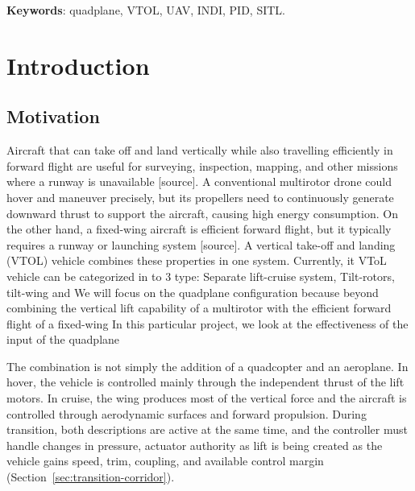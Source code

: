 \documentclass{article}
\begin{document}
\noindent\textbf{Keywords}: quadplane, VTOL, UAV, INDI, PID, SITL.



\clearpage

\section{Introduction}
\label{sec:introduction}

\subsection{Motivation}
Aircraft that can take off and land vertically while also travelling efficiently in forward flight are useful for surveying, inspection, mapping, and other missions where a runway is unavailable [source].
A conventional multirotor drone could hover and maneuver precisely, but its propellers need to continuously generate downward thrust to support the aircraft, causing high energy consumption. On the other hand, a fixed-wing aircraft is efficient forward flight, but it typically requires a runway or launching system [source]. A vertical take-off and landing (VTOL) vehicle combines these properties in one system.
Currently, it VToL vehicle can be categorized in to 3 type: Separate lift-cruise system, Tilt-rotors, tilt-wing and 
We will focus on the quadplane configuration because beyond combining the vertical lift capability of a multirotor with the efficient forward flight of a fixed-wing  In this particular project, we look at the effectiveness of the input of the quadplane 

The combination is not simply the addition of a quadcopter and an aeroplane. In hover, the vehicle is controlled mainly through the independent thrust of the lift motors. In cruise, the wing produces most of the vertical force and the aircraft is controlled through aerodynamic surfaces and forward propulsion. During transition, both descriptions are active at the same time, and the controller must handle changes in pressure, actuator authority as lift is being created as the vehicle gains speed, trim, coupling, and available control margin (Section~\ref{sec:transition-corridor}).
\end{document}
